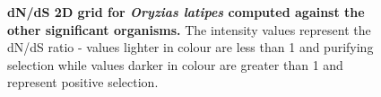 \documentclass{article}
\begin{document}
\begin{figure}[H]
\centering
{}
\caption{\textbf{dN/dS 2D grid for \textit{Oryzias latipes} computed against the other significant organisms.} The intensity values represent the dN/dS ratio - values lighter in colour are less than 1 and purifying selection while values darker in colour are greater than 1 and represent positive selection.}
\label{sup_fig_31}
\end{figure}
\end{document}
